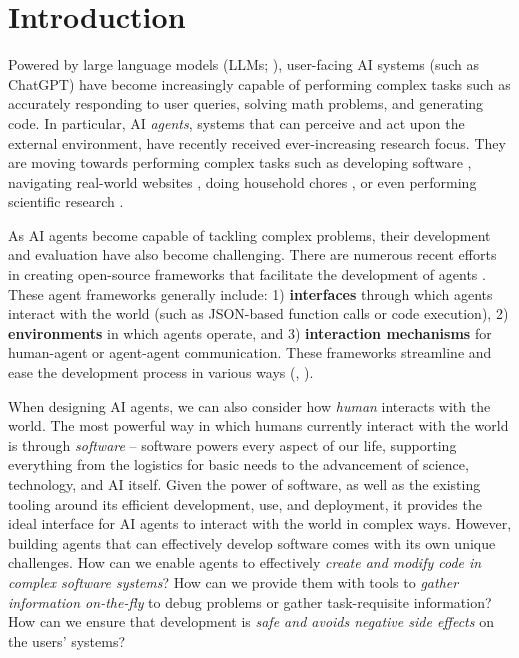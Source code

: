\section{Introduction}

Powered by large language models (LLMs; \citealt{openai2024gpt4o,team2023gemini,jiang2024mixtral,chang2024survey}), user-facing AI systems (such as ChatGPT) have become increasingly capable of performing complex tasks such as accurately responding to user queries, solving math problems, and generating code.
In particular, AI \emph{agents}, systems that can perceive and act upon the external environment, have recently received ever-increasing research focus.
They are moving towards performing complex tasks such as developing software \citep{jimenez2024swebench},
navigating real-world websites \citep{zhou2023webarena}, doing household chores \citep{ahn2022can}, or even performing scientific research \citep{boiko2023autonomous,tang2024prioritizing}. 

As AI agents become capable of tackling complex problems, their development and evaluation have also become challenging. 
There are numerous recent efforts in creating open-source frameworks that facilitate the development of agents \citep{hong2023metagpt,chen2024autoagents,wu2023autogen}.
These agent frameworks generally include: 1) \textbf{interfaces} through which agents interact with the world (such as JSON-based function calls or code execution), 2) \textbf{environments} in which agents operate, and 3) \textbf{interaction mechanisms} for human-agent or agent-agent communication.
These frameworks streamline and ease the development process in various ways (, ).

When designing AI agents, we can also consider how \emph{human} interacts with the world.
The most powerful way in which humans currently interact with the world is through \emph{software} -- software powers every aspect of our life, supporting everything from the logistics for basic needs to the advancement of science, technology, and AI itself.
Given the power of software, as well as the existing tooling around its efficient development, use, and deployment, it provides the ideal interface for AI agents to interact with the world in complex ways.
However, building agents that can effectively develop software comes with its own unique challenges.
How can we enable agents to effectively \emph{create and modify code in complex software systems}?
How can we provide them with tools to \emph{gather information on-the-fly} to debug problems or gather task-requisite information?
How can we ensure that development is \emph{safe and avoids negative side effects} on the users' systems?

